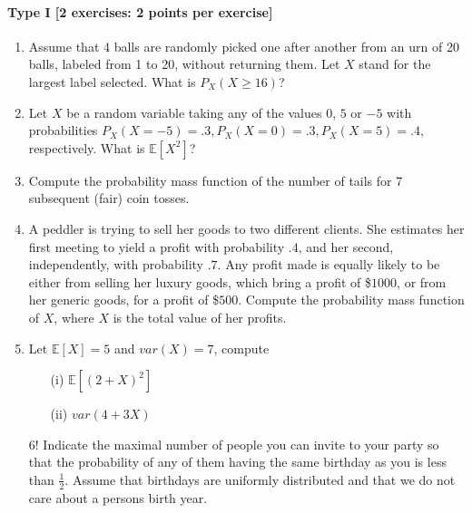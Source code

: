 \documentclass{article}
\begin{document}
\paragraph{Type I [2 exercises: 2 points per exercise]}
\begin{enumerate}
	\item Assume that 4 balls are randomly picked one after another from an urn of 20 balls, labeled from 1 to 20, without returning them. Let $X$ stand for the largest label selected. What is $P_X(X \geq 16)$?
	\item Let $X$ be a random variable taking any of the values $0$, $5$ or $-5$ with probabilities $P_X(X = -5) = .3, P_X(X = 0) = .3, P_X(X = 5) = .4$, respectively. What is $\mathbb{E}[X^2]$?
	\item Compute the probability mass function of the number of tails for 7 subsequent (fair) coin tosses. 
	\item A peddler is trying to sell her goods to two different clients. She estimates her first meeting to yield a profit with probability $.4$, and her second, independently, with probability $.7$. Any profit made is equally likely to be either from selling her luxury goods, which bring a profit of \$$1000$, or from her generic goods, for a profit of \$$500$. Compute the probability mass function of $X$, where $X$ is the total value of her profits.
	\item Let $\mathbb{E}[X] = 5$ and $var(X) = 7$, compute
		\begin{itemize}
			\item[(i)] $\mathbb{E}[(2 + X)^2]$
			\item[(ii)] $var(4 + 3X)$
		\end{itemize}
	\item[6!] Indicate the maximal number of people you can invite to your party so that the probability of any of them having the same birthday as you is less than $\frac{1}{2}$. Assume that birthdays are uniformly distributed and that we do not care about a persons birth year. 
\end{enumerate}
\end{document}
